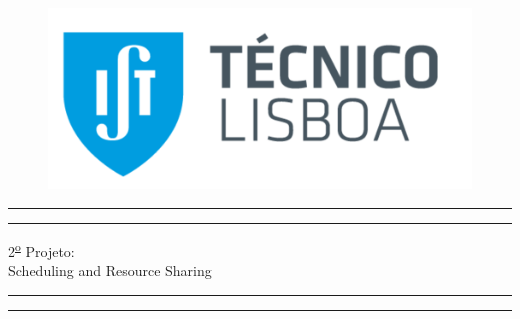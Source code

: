 \documentclass{article} %
\begin{document}
 

\begin{titlepage} %

	\begin{figure}[t]
	\graphicspath{ {../../} }
	\includegraphics[width = 8 cm]{logo.png}
	\centering
	\end{figure}
	
	\centering %
	
	\scshape %
	
	\vspace*{\baselineskip} %
	
	
	\rule{\textwidth}{1.6pt}\vspace*{-\baselineskip}\vspace*{2pt} %
	\rule{\textwidth}{0.4pt} %
	
	\vspace{0.75\baselineskip} %
	
	{\LARGE 2\textsuperscript{\underline{o}} Projeto:\\Scheduling and Resource Sharing\par} %
	
	\vspace{0.75\baselineskip} %
	
	\rule{\textwidth}{0.4pt}\vspace*{-\baselineskip}\vspace{3.2pt} %
	\rule{\textwidth}{1.6pt} %
	
	\vspace{2\baselineskip} %
	
	

\end{titlepage}
\end{document}

